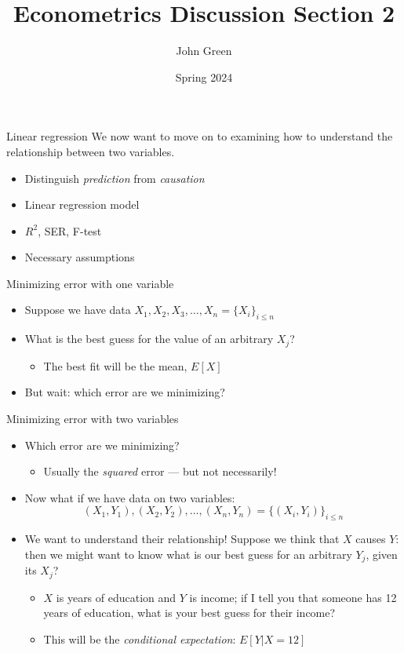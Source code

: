 \documentclass[aspectratio=169]{beamer}
\title{Econometrics Discussion Section 2}
\author{John Green}
\date{Spring 2024}
\begin{document}
\begin{frame}
    \titlepage 
\end{frame}

\begin{frame}{Linear regression}
    We now want to move on to examining how to understand the relationship between two variables.
    \begin{itemize}
        \item Distinguish \textit{prediction} from \textit{causation}
        \item Linear regression model
        \item $R^2$, SER, F-test
        \item Necessary assumptions
    \end{itemize}
\end{frame}

\begin{frame}{Minimizing error with one variable}
    \begin{itemize}
        \item Suppose we have data $X_1, X_2, X_3, \ldots, X_n = \{ X_i \}_{i \leq n} $
        \item What is the best guess for the value of an arbitrary $X_j$?
        \begin{itemize}
            \item The best fit will be the mean, $ E[X] $
        \end{itemize}
        \item But wait: which error are we minimizing?
    \end{itemize}
\end{frame}

\begin{frame}{Minimizing error with two variables}
    \begin{itemize}
        \item Which error are we minimizing?
        \begin{itemize}
            \item Usually the \textit{squared} error --- but not necessarily!
        \end{itemize}
        \item Now what if we have data on two variables:
        $$
        (X_1, Y_1), (X_2, Y_2), \ldots, (X_n, Y_n) = \{ (X_i, Y_i) \}_{i \leq n}
        $$
        \item We want to understand their relationship! Suppose we think that $X$ causes $Y$: then we might want to know what is our best guess for an arbitrary $Y_j$, given its $X_j$?
        \begin{itemize}
            \item $X$ is years of education and $Y$ is income; if I tell you that someone has 12 years of education, what is your best guess for their income?
            \item This will be the \textit{conditional expectation}: $E[Y|X=12]$
        \end{itemize}
    \end{itemize}
\end{frame}
\end{document}
